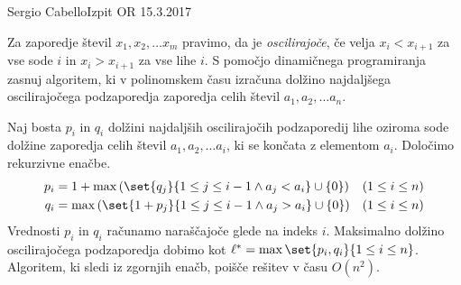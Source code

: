 \begin{naloga}{Sergio Cabello}{Izpit OR 15.3.2017}
\begin{vprasanje}
Za zaporedje števil $x_1, x_2, \dots x_m$ pravimo, da je {\em oscilirajoče},
če velja $x_i < x_{i+1}$ za vse sode $i$ in $x_i > x_{i+1}$ za vse lihe $i$.
S pomočjo dinamičnega programiranja zasnuj algoritem,
ki v polinomskem času izračuna dolžino najdaljšega oscilirajočega podzaporedja
zaporedja celih števil $a_1, a_2, \dots a_n$.
\end{vprasanje}

\begin{odgovor}
Naj bosta $p_i$ in $q_i$ dolžini najdaljših oscilirajočih podzaporedij
lihe oziroma sode dolžine zaporedja celih števil $a_1, a_2, \dots a_i$,
ki se končata z elementom $a_i$.
Določimo rekurzivne enačbe.
\begin{align*}
p_i &= 1 + \max\left(\set{q_j}{1 \le j \le i-1 \land a_j < a_i} \cup \{0\}\right)
&& (1 \le i \le n) \\
q_i &= \max\left(\set{1 + p_j}{1 \le j \le i-1 \land a_j > a_i} \cup \{0\}\right)
&& (1 \le i \le n)
\end{align*}
Vrednosti $p_i$ in $q_i$ računamo naraščajoče glede na indeks $i$.
Maksimalno dolžino oscilirajočega podzaporedja dobimo kot
$\ell^* = \max\set{p_i, q_i}{1 \le i \le n}$.
Algoritem, ki sledi iz zgornjih enačb, poišče rešitev v času $O(n^2)$.


\end{odgovor}
\end{naloga}
